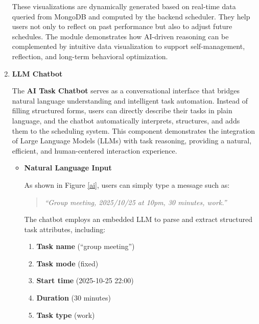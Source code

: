\documentclass[12pt, a4paper]{article}
\begin{document}
\begin{enumerate}
\begin{itemize}
                    \end{itemize}
                    
                    These visualizations are dynamically generated based on real-time data queried from MongoDB and computed by the backend scheduler. They help users not only to reflect on past performance but also to adjust future schedules. The module demonstrates how AI-driven reasoning can be complemented by intuitive data visualization to support self-management, reflection, and long-term behavioral optimization.
                    
                                    
                \item \textbf{LLM Chatbot}
                
                    The \textbf{AI Task Chatbot} serves as a conversational interface that bridges natural language understanding and intelligent task automation. Instead of filling structured forms, users can directly describe their tasks in plain language, and the chatbot automatically interprets, structures, and adds them to the scheduling system. This component demonstrates the integration of Large Language Models (LLMs) with task reasoning, providing a natural, efficient, and human-centered interaction experience.

                    \begin{itemize}
                        \item \textbf{Natural Language Input}  

                            As shown in Figure \ref{ai}, users can simply type a message such as:
                            
                            \begin{quote}
                                \textit{“Group meeting, 2025/10/25 at 10pm, 30 minutes, work.”}
                            \end{quote}
                            
                            The chatbot employs an embedded LLM to parse and extract structured task attributes, including:
                            
                            \begin{enumerate}
                                \item \textbf{Task name} (“group meeting”)
                                \item \textbf{Task mode} (fixed)
                                \item \textbf{Start time} (2025-10-25 22:00)
                                \item \textbf{Duration} (30 minutes)
                                \item \textbf{Task type} (work)
                            \end{enumerate}


\end{itemize}
\end{enumerate}
\end{document}
